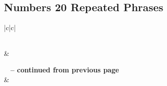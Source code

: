 \subsection{Numbers 20 Repeated Phrases}


\normalsize
 
\begin{center}
\begin{longtable}{|c|c|}
\caption[Numbers 20 Repeated Phrases]{Numbers 20 Repeated Phrases}\label{table:Repeated Phrases Numbers 20} \\
\hline {} &  \\ \hline 
\endfirsthead
 
{{\bfseries \tablename\ \thetable{} -- continued from previous page}} \\  
\hline {} &  \\ \hline 
\endhead
 

\end{longtable}
\end{center}
